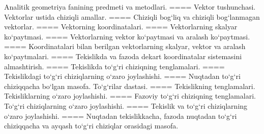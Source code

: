 Analitik geometriya fanining predmeti va metodlari.
====
Vektor tushunchasi. Vektorlar ustida chiziqli amallar.
====
Chiziqli bog‘liq va chiziqli bog‘lanmagan vektorlar.
====
Vektorning koordinatalari.
====
Vektorlarning skalyar ko‘paytmasi.
====
Vektorlarning vektor ko‘paytmasi va aralash ko‘paytmasi.
====
Koordinatalari bilan berilgan vektorlarning skalyar, vektor va aralash ko‘paytmalari.
====
Tekislikda va fazoda dekart koordinatalar sistemasini almashtirish.
====
Tekislikda to‘g‘ri chiziqning tenglamalari.
====
Tekislikdagi to‘g‘ri chiziqlarning o‘zaro joylashishi.
====
Nuqtadan to‘g‘ri chiziqqacha bo‘lgan masofa. To‘g‘rilar dastasi.
====
Tekislikning tenglamalari. Tekisliklarning o‘zaro joylashishi.
====
Fazoviy to‘g‘ri chiziqning tenglamalari. To‘g‘ri chiziqlarning o‘zaro joylashishi.
====
Tekislik va to‘g‘ri chiziqlarning o‘zaro joylashishi.
====
Nuqtadan tekislikkacha, fazoda nuqtadan to‘g‘ri chiziqqacha va ayqash to‘g‘ri chiziqlar orasidagi masofa.